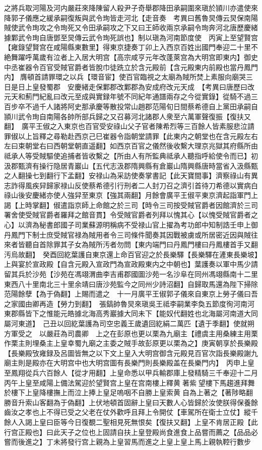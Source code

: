 之將兵取河陽及河内嚴莊來降陳留人殺尹子奇舉郡降田承嗣圍來瑱於頴川亦遣使來降郭子儀應之緩承嗣復叛與武令珣皆走河北【走音奏　考異曰舊魯炅傳云炅保南陽賊使武令珣攻之令珣死又令田承嗣攻之下又曰王師收兩京承嗣令珣奔河北唐歷慶緒據鄴武令珣自唐鄧至炅傳云武令珣死誤也】制以瑱為河南節度使　丙寅上至望賢宫【雍錄望賢宫在咸陽縣東數里】得東京捷奏丁卯上入西京百姓出國門奉迎二十里不絶舞躍呼萬歲有泣者上入居大明宫【高宗咸亨元年改蓬萊宫為大明宫即東内】御史中丞崔器令百官受賊官爵者皆脫巾徒跣立於含元殿前【含元殿東内前殿也當丹鳳門内】膺頓首請罪環之以兵【環音宦】使百官臨視之太廟為賊所焚上素服向廟哭三日是日上皇發蜀郡　安慶緒走保鄴郡改鄴郡為安成府改元天成　【考異曰唐歷曰改元天和薊門紀亂曰改元至成與實録年號不同紀年通譜兩存之今從實錄】從騎不過三百步卒不過千人諸將阿史那承慶等散投常山趙郡范陽旬日間蔡希德自上黨田承嗣自頴川武令珣自南陽各帥所部兵歸之又召募河北諸郡人衆至六萬軍聲復振【復扶又翻】　廣平王俶之入東京也百官受安祿山父子官者陳希烈等三百餘人皆素服悲泣請罪俶以上旨釋之尋勒赴西京己巳崔器令詣朝堂請罪【此東内之朝堂也在含元殿左右左曰束朝堂右曰西朝堂朝直遥翻】如西京百官之儀然後收繫大理京兆獄其府縣所由祗承人等受賊驅使追捕者皆收繫之【所由人有所監典祗承人聽指呼給使令而已】初汲郡甄濟有操行隐居青巖山【五代志汲郡隋興縣有倉巖山隋興縣唐時當省入汲縣甄之人翻操七到翻行下孟翻】安禄山為采訪使奏掌書記【此天寶間事】濟察祿山有異志詐得風疾舁歸家禄山反使蔡希德引行刑者二人封刀召之濟引首待刀希德以實病白祿山後安慶緒亦使人強舁至東京【強其兩翻】月餘會廣平王俶平東京濟起詣軍門上謁【上時掌翻】俶遣詣京師上命館之於三司【時令三司按受賊官爵者因館濟於三司署舍使受賊官爵者羅拜之館音貫】令受賊官爵者列拜以愧其心【以愧受賊官爵者之心】以濟為秘書郎國子司業蘇源明稱病不受禄山官上擢為考功郎中知制誥壬申上御丹鳳門下制士庶受賊官禄為賊用者令三司條件聞奏其因戰被虜或所居密近因與賊往來者皆聽自首除罪其子女為賊所汚者勿問【東内端門曰丹鳳門樓曰丹鳳樓首手又翻汚烏故翻】　癸酉回紇葉護自東京還上命百官迎之於長樂驛【長樂驛在滻東長樂坡】上與宴於宣政殿【自含元殿入宣政門為宣政殿東内之中朝也】葉護奏以軍中馬少請留其兵於沙苑【沙苑在馮翊渭曲李吉甫郡國圖沙苑一名沙阜在同州馮翊縣南十二里東西八十里南北三十里余靖曰唐沙苑監今之同州少詩沼翻】自歸取馬還為陛下掃除范陽餘孽【為于偽翻】上賜而遣之　十一月廣平王俶郭子儀來自東京上勞子儀曰吾之家國由卿再造【勞力到翻】　張鎬帥魯炅來瑱吳王祗李嗣業李奐五節度徇河南河東郡縣皆下之惟能元皓據北海高秀巖據大同未下【能奴代翻姓也北海屬河南道大同屬河東道】　己丑以回紇葉護為司空忠義王歲遺回紇絹二萬匹【遺于季翻】使就朔方軍受之　以嚴莊為司農卿　上之在彭原也更以栗為九廟主【禮虞主用桑練主用栗作栗主則埋桑主上皇幸蜀九廟之主委之賊手故彭原更以栗為之】庚寅朝享於長樂殿【長樂殿攷雍録及呂圖皆無之以下文上皇入大明宫御含元殿見百官次詣長樂殿謝九廟主則是殿亦在大明宫中也大明宫圖有長樂門則長樂殿盖在長樂門内】　丙申上皇至鳳翔從兵六百餘人【從才用翻】上皇命悉以甲兵輸郡庫上發精騎三千奉迎十二月丙午上皇至咸陽上備法駕迎於望賢宫上皇在宫南樓上釋黄著紫望樓下馬趨進拜舞於樓下上皇降樓撫上而泣上捧上皇足嗚咽不自勝上皇索黄自為上著之【著陟略翻勝音升索山客翻為于偽翻】上伏地頓首固辭上皇曰天數人心皆歸於汝使朕得保養餘齒汝之孝也上不得已受之父老在仗外歡呼且拜上令開仗【車駕所在衛士立仗】縱千餘人入謁上皇曰臣等今日復覩二聖相見死無恨矣【復扶又翻】上皇不肯居正殿【此行宫正殿也】曰此天子之位也上固請自扶上皇登殿尚食進食上品嘗而薦之【品品必嘗而後進之】丁未將發行宫上親為上皇習馬而進之上皇上皇上馬上親執鞚行數步